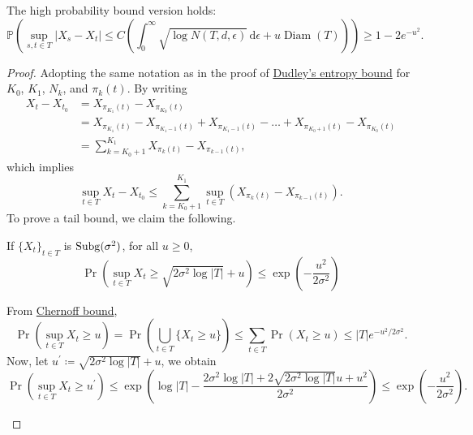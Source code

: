 \begin{corollary}\label{pf-col:Dudley-integral-entropy-bound-hp}
	The high probability bound version holds:
	\[
		\mathbb{P} \left(
		\sup _{s, t\in T} \vert X_s - X_t \vert
		\leq C \left( \int_{0}^{\infty} \sqrt{\log N(T, d, \epsilon )}  \,\mathrm{d}\epsilon + u \mathop{\mathrm{Diam}}(T) \right)
		\right) \geq 1 - 2 e^{-u^2}.
	\]
\end{corollary}
\begin{proof}
	Adopting the same notation as in the proof of \hyperref[thm:Dudley-entropy-bound]{Dudley's entropy bound} for \(K_0\), \(K_1\), \(N_k\), and \(\pi _k(t)\). By writing
	\[
		\begin{split}
			X_t - X_{t_0}
			&= X_{\pi _{K_1} (t)} - X_{\pi _{K_0} (t)}\\
			&= X_{\pi _{K_1}(t)} - X_{\pi _{K_1 - 1} (t)} + X_{\pi _{K_1 - 1} (t)} - \dots + X_{\pi _{K_0 + 1} (t)} - X_{\pi _{K_0} (t)} \\
			&= \sum_{k = K_0 + 1}^{K_1} X_{\pi _{k} (t)} - X_{\pi _{k - 1} (t)},
		\end{split}
	\]
	which implies
	\[
		\sup _{t\in T} X_t - X_{t_0}
		\leq \sum_{k = K_0 + 1}^{K_1} \sup _{t\in T} \left( X_{\pi _{k} (t)} - X_{\pi _{k - 1} (t)} \right).
	\]
	To prove a tail bound, we claim the following.

	\begin{claim}
		If \(\{ X_t \} _{t\in T}\) is \(\operatorname{Subg}(\sigma ^2)\), for all \(u \geq 0\),
		\[
			\Pr(\sup _{t\in T} X_t \geq \sqrt{2 \sigma ^2 \log \vert T \vert } + u ) \leq \exp(- \frac{u^2}{2\sigma ^2})
		\]
	\end{claim}
	\begin{explanation}
		From \hyperref[lma:MGF-trick]{Chernoff bound},
		\[
			\Pr(\sup _{t\in T} X_t \geq u)
			= \Pr(\bigcup_{t\in T} \{ X_t \geq u \} )
			\leq \sum_{t\in T} \Pr_{}(X_t \geq u)
			\leq \vert T \vert e^{-u^2 / 2\sigma ^2}.
		\]
		Now, let \(u^{\prime} \coloneqq \sqrt{2 \sigma ^2 \log \vert T \vert } + u \), we obtain
		\[
			\Pr(\sup _{t\in T} X_t \geq u^{\prime} )
			\leq \exp(\log \vert T \vert - \frac{2\sigma ^2 \log \vert T \vert + 2 \sqrt{2\sigma ^2 \log \vert T \vert } u + u^2}{2\sigma ^2})
			\leq \exp(- \frac{u^2}{2\sigma ^2}).
		\]
	\end{explanation}


\end{proof}
